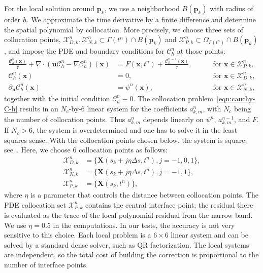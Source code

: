 \documentclass[11pt,reqno]{amsart}
\theoremstyle{plain}
\theoremstyle{definition}
\numberwithin{equation}{section}
\newcommand{\paren}[1]{\left(#1\right)}
\newcommand{\grad}[1]{\nabla #1}
\newcommand{\bm}[1]{\boldsymbol{#1}}
\newcommand{\Corr}{\mathcal C}
\begin{document}
For the local solution around $\bm p_k$, we use a neighborhood $B(\bm p_k)$ with radius of order $h$. We approximate the time derivative by a finite difference and determine the spatial polynomial by collocation. More precisely, we choose three sets of collocation points, $\mathcal{X}_{D,k}^n,\mathcal{X}_{N,k}^n\subset \Gamma(t^n)\cap B(\bm p_k)$ and $\mathcal{X}_{P,k}^n\subset\Omega_{\Gamma(t^n)}\cap B(\bm p_k)$, and impose the PDE and boundary conditions for $\Corr_h^n$ at those points:
\begin{equation}\label{eqn:cauchy-C-h}
\begin{aligned}
  \frac{\Corr_h^n(\bm x)}{\tau} + \grad\cdot\paren{\bm u\Corr_h^n - \grad \Corr_h^n}(\bm x) &= F(\bm x,t^n) + \frac{\Corr_h^{n-1}(\bm x)}{\tau}, \quad&&\text{ for }\bm x\in \mathcal{X}_{P,k}^n,\\
\Corr_h^n(\bm x) &= 0, \quad&&\text{ for }\bm x\in \mathcal{X}_{D,k}^n,\\
\partial_{\bm n} \Corr_h^n(\bm x) &= \psi^n(\bm x), \quad&&\text{ for }\bm x\in \mathcal{X}_{N,k}^n,
\end{aligned}
\end{equation}
together with the initial condition $\Corr_h^0\equiv 0$.
The collocation problem~\eqref{eqn:cauchy-C-h} results in an $N_c$-by-$6$ linear system for the coefficients $a_{k,m}^n$, with $N_c$ being the number of collocation points.
Thus $a_{k,m}^n$ depends linearly on $\psi^n$, $a_{k,m}^{n-1}$, and $F$.
If $N_c>6$, the system is overdetermined and one has to solve it in the least squares sense.
With the collocation points chosen below, the system is square; see~\cite{zhou2024correction}.
Here, we choose $6$ collocation points as follows:
\begin{equation}
\begin{aligned}
  \mathcal{X}_{D,k}^n &= \{ \bm X(s_k+ j\eta\Delta s,t^n), j = -1,0,1\}, \\
  \mathcal{X}_{N,k}^n &= \{ \bm X(s_k+ j\eta\Delta s,t^n), j = -1,1\}, \\
  \mathcal{X}_{P,k}^n &= \{\bm X(s_k,t^n)\},
\end{aligned}
\end{equation}
where $\eta$ is a parameter that controls the distance between collocation points. The PDE collocation set $\mathcal{X}_{P,k}^n$ contains the central interface point; the residual there is evaluated as the trace of the local polynomial residual from the narrow band. We use $\eta=0.5$ in the computations. In our tests, the accuracy is not very sensitive to this choice.
Each local problem is a $6\times6$ linear system and can be solved by a standard dense solver, such as QR factorization. The local systems are independent, so the total cost of building the correction is proportional to the number of interface points.
\end{document}

